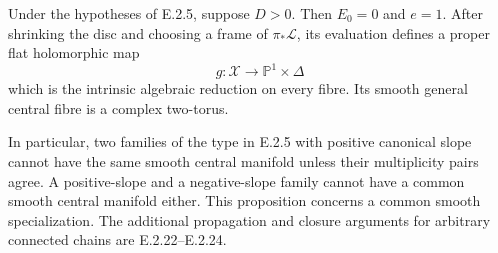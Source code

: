 \begin{proposition}
Under the hypotheses of E.2.5, suppose $D>0$.  Then $E_0=0$
and $e=1$.  After shrinking the disc and choosing a frame of
$\pi_*\mathcal L$, its evaluation defines a proper flat
holomorphic map
\[
 g:\mathcal X\longrightarrow\mathbb P^1\times\Delta
\]
which is the intrinsic algebraic reduction on every fibre.
Its smooth general central fibre is a complex two-torus.

In particular, two families of the type in E.2.5 with positive
canonical slope cannot have the same smooth central manifold
unless their multiplicity pairs agree.  A positive-slope and
a negative-slope family cannot have a common smooth central
manifold either.  This proposition concerns a common smooth
specialization.  The additional propagation and closure
arguments for arbitrary connected chains are E.2.22--E.2.24.
\end{proposition}
